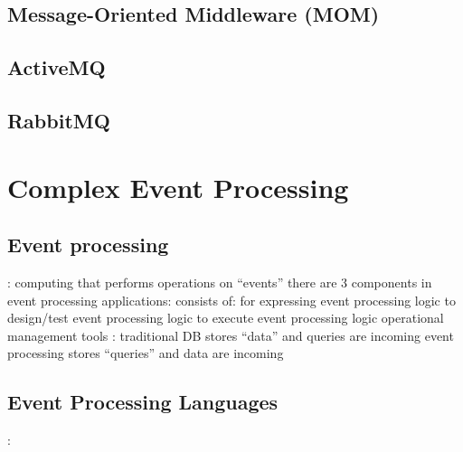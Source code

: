\documentclass{myproc}
\begin{document}

\subsection{Message-Oriented Middleware (MOM)}

\subsection{ActiveMQ}

\subsection{RabbitMQ}


\section{Complex Event Processing}
\subsection{Event processing}
\bit
\w {}: computing that performs operations on ``events''
\w there are 3 components in event processing applications:
  \ben
  \w [(a)] 
  \w [(b)] 
  \w [(c)] 
  \een
\w {} consists of:
  \ben
  \w [(a)]  for expressing event processing logic
  \w [(b)]  to design/test event processing logic
  \w [(c)]  to execute event processing logic
  \w [(d)] 
  \w [(e)] operational management tools
  \een
\w {}:
  \bit
  \w traditional DB stores ``data'' and queries are incoming
  \w event processing stores ``queries'' and  data are incoming
  \eit
\eit

\subsection{Event Processing Languages}
\bit
\w {}:  \vspace*{0.2cm}
\end{document}
